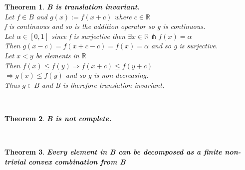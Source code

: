 \documentclass[12pt]{extarticle}
\theoremstyle{plain}
\newtheorem{thm}{Theorem}[section]
\theoremstyle{plain}
\theoremstyle{plain}
\theoremstyle{Definition}
\theoremstyle{Definition}
\theoremstyle{plain}
\newcommand{\cut}[0]{\noindent\framebox[\linewidth]{\rule{\linewidth}{2pt}}\\}
\begin{document}
	\begin{thm} \textbf{B is translation invariant.} \\
			Let $f \in B$ and $g(x) := f(x+c)$ where $c \in \mathbb{R}$ \\
			f is continuous and so is the addition operator so g is continuous. \\
			Let $\alpha \in [0,1]$ since f is surjective then $\exists x \in \mathbb{R} \pitchfork f(x) = \alpha$ \\ 
			Then $g(x-c) = f(x+c-c) = f(x) = \alpha$ and so g is surjective. \\ 
			Let $x < y$ be elements in $\mathbb{R}$ \\
			Then $f(x) \leq f(y) \Rightarrow f(x+c) \leq f(y+c)$ \\ 
			$\Rightarrow g(x) \leq f(y)$ and so g is non-decreasing. \\ 
			Thus $g \in B$ and B is therefore translation invariant. 
	\end{thm}
	\cut
	\begin{thm} \textbf{B is not complete.} \\
			
	\end{thm}
	\cut
	\begin{thm} \textbf{Every element in B can be decomposed as a finite non-trivial convex combination from B} \\
	
	\end{thm}
	\cut
	\newpage
\end{document}
